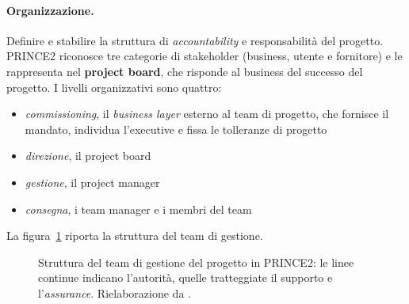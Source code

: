 \paragraph{Organizzazione.} Definire e stabilire la struttura di
\emph{accountability} e responsabilit\`a del progetto. PRINCE2 riconosce tre
categorie di stakeholder (business, utente e fornitore) e le rappresenta
nel \textbf{project board}, che risponde al business del successo del progetto.
I livelli organizzativi sono quattro:
\begin {itemize}
\item \emph{commissioning}, il \emph{business layer} esterno al team di
progetto, che fornisce il mandato, individua l'executive e fissa le tolleranze
di progetto
\item \emph{direzione}, il project board
\item \emph{gestione}, il project manager
\item \emph{consegna}, i team manager e i membri del team
\end {itemize}
La figura~\ref{fig:p2-org} riporta la struttura del team di gestione.

\begin{figure}[htbp]
\centering
{}
\caption{Struttura del team di gestione del progetto in PRINCE2: le linee continue indicano l'autorit\`a, quelle tratteggiate il supporto e l'\emph{assurance}. Rielaborazione da \cite{prince27}.}
\label{fig:p2-org}
\end{figure}
\newpage

